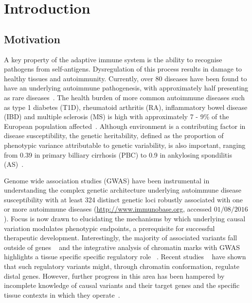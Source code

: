 \documentclass[a4paper,11pt]{report}
\begin{document}
\chapter{Introduction}
\section{Motivation}

A key property of the adaptive immune system is the ability to recognise pathogens from self-antigens.  Dysregulation of this process results in damage to healthy tissues and autoimmunity. Currently, over 80 diseases have been found to have an underlying autoimmune pathogenesis, with approximately half presenting as rare diseases~\citep{HayterCook2012}. The health burden of more common autoimmune diseases such as type 1 diabetes (T1D), rheumatoid arthritis (RA), inflammatory bowel disease (IBD) and multiple sclerosis (MS) is high with approximately 7 - 9$\%$ of the European population affected~\citep{CooperBynumSomers2009}. Although environment is a contributing factor in disease susceptibility, the genetic heritability, defined as the proportion of phenotypic variance attributable to genetic variability, is also important, ranging from 0.39 in primary billiary cirrhosis (PBC) to 0.9 in ankylosing spondilitis (AS)~\citep{Gutierrez-ArcelusRichRaychaudhuri2016}.  

Genome wide association studies (GWAS) have been instrumental in understanding the complex genetic architecture underlying autoimmune disease susceptibility with at least 324 distinct genetic loci robustly associated with one or more autoimmune diseases (\url{http://www.immunobase.org}, accessed $01/08/2016$). Focus is now drawn to elucidating the mechanisms by which underlying causal variation modulates phenotypic endpoints, a prerequisite for successful therapeutic development. Interestingly, the majority of associated variants fall outside of genes ~\citep{MauranoHumbertRynesEtAl2012} and the integrative analysis of chromatin marks with GWAS highlights a tissue specific specific regulatory role ~\citep{FarhMarsonZhuEtAl2015}.  Recent studies ~\citep{ClaussnitzerDankelKimEtAl2015,SmemoTenaKimEtAl2014,Davison2012-zk} have shown that such regulatory variants might, through chromatin conformation, regulate distal genes. However, further progress in this area has been hampered by incomplete knowledge of causal variants and their target genes and the specific tissue contexts in which they operate~\citep{Albert2015-jn}.
\end{document}
